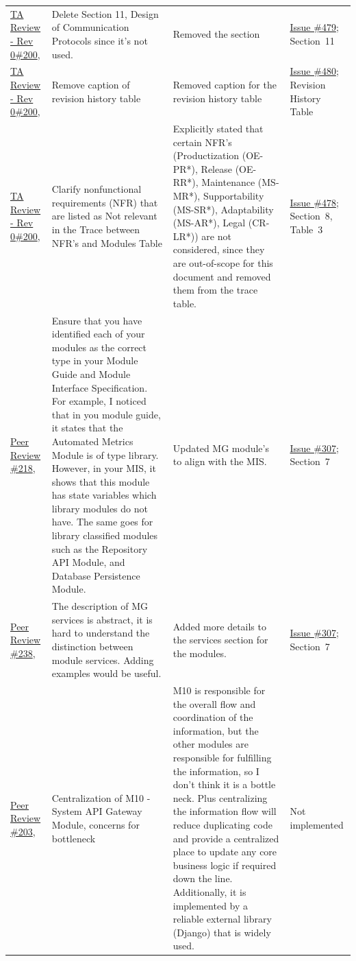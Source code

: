 \documentclass{article}
\begin{document}
\begin{longtable}{p{} p{}
                  p{} p{}}
\href{https://github.com/thaafei/DomainX/issues/339}{TA Review - Rev 0\#200},&
Delete Section 11, Design of Communication Protocols since it's not used.
&
Removed the section
&
\href{https://github.com/thaafei/DomainX/issues/479}{Issue \#479}; Section~11
\\

\href{https://github.com/thaafei/DomainX/issues/339}{TA Review - Rev 0\#200},&
Remove caption of revision history table
&
Removed caption for the revision history table
&
\href{https://github.com/thaafei/DomainX/issues/480}{Issue \#480}; Revision History Table
\\

\href{https://github.com/thaafei/DomainX/issues/339}{TA Review - Rev 0\#200},&
Clarify nonfunctional requirements (NFR) that are listed as Not relevant in the Trace between NFR's and Modules Table&
Explicitly stated that certain NFR's (Productization (OE-PR*), Release (OE-RR*), Maintenance (MS-MR*), Supportability (MS-SR*), Adaptability (MS-AR*), Legal (CR-LR*)) are not considered, since they are out-of-scope for this document and removed them from the trace table.
&
\href{https://github.com/thaafei/DomainX/issues/478}{Issue \#478}; Section~8, Table~3
\\

\href{https://github.com/thaafei/DomainX/issues/218}{Peer Review \#218},
&
Ensure that you have identified each of your modules as the correct type in your Module Guide and Module Interface Specification. For example, I noticed that in you module guide, it states that the Automated Metrics Module is of type library. However, in your MIS, it shows that this module has state variables which library modules do not have. The same goes for library classified modules such as the Repository API Module, and Database Persistence Module.
&
Updated MG module's to align with the MIS.
&
\href{https://github.com/thaafei/DomainX/issues/307}{Issue \#307}; Section~7
\\

\href{https://github.com/thaafei/DomainX/issues/238}{Peer Review \#238},
&
The description of MG services is abstract, it is hard to understand the distinction between module services. Adding examples would be useful.
&
Added more details to the services section for the modules.
&
\href{https://github.com/thaafei/DomainX/issues/307}{Issue \#307}; Section~7
\\

\href{https://github.com/thaafei/DomainX/issues/203}{Peer Review \#203},
&
Centralization of M10 - System API Gateway Module, concerns for bottleneck
&
M10 is responsible for the overall flow and coordination of the information, but the other modules are responsible for fulfilling the information, so I don't think it is a bottle neck.
Plus centralizing the information flow will reduce duplicating code and provide a centralized place to update any core business logic if required down the line. Additionally, it is implemented by a reliable external library (Django) that is widely used.
&
Not implemented
\\


\end{longtable}
\end{document}

